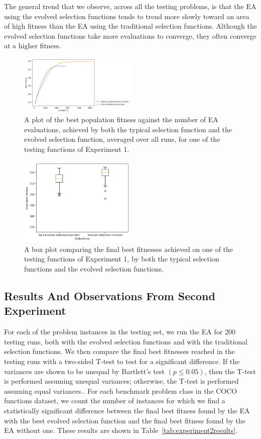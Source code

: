 \documentclass[sigconf]{acmart}
\begin{document}
The general trend that we observe, across all the testing problems, is that the EA using the evolved selection functions tends to trend more slowly toward an area of high fitness than the EA using the traditional selection functions. Although the evolved selection functions take more evaluations to converge, they often converge at a higher fitness.
\begin{figure}
	\centering
	\includegraphics[width=0.5\textwidth]{Experiment1LinePlot}
	\caption{A plot of the best population fitness against the number of EA evaluations, achieved by both the typical selection function and the evolved selection function, averaged over all runs, for one of the testing functions of Experiment 1.}
	\label{fig:Experiment1LinePlot}
\end{figure}

\begin{figure}
	\centering
	\includegraphics[width=0.5\textwidth]{Experiment1Boxplot}
	\caption{A box plot comparing the final best fitnesses achieved on one of the testing functions of Experiment 1, by both the typical selection functions and the evolved selection functions.}
	\label{fig:Experiment1Boxplot}
\end{figure}

\subsection{Results And Observations From Second Experiment}
\label{secondExperimentResults}

For each of the problem instances in the testing set, we run the EA for 200 testing runs, both with the evolved selection functions and with the traditional selection functions. We then compare the final best fitnesses reached in the testing runs with a two-sided T-test to test for a significant difference. If the variances are shown to be unequal by Bartlett's test $(p \leq 0.05)$, then the T-test is performed assuming unequal variances; otherwise, the T-test is performed assuming equal variances.. For each benchmark problem class in the COCO functions dataset, we count the number of instances for which we find a statistically significant difference between the final best fitness found by the EA with the best evolved selection function and the final best fitness found by the EA without one. These results are shown in Table~\ref{tab:experiment2results}. 
\end{document}
